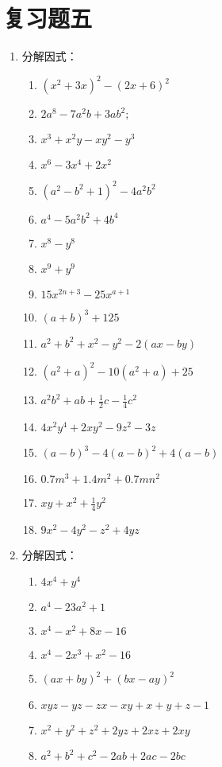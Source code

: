 \section*{复习题五}

\begin{enumerate}
\item 分解因式：
\begin{multicols}{2}
    \begin{enumerate}
    \item $\left(x^{2}+3 x\right)^{2}-(2 x+6)^{2}$
    \item $2 a^{8}-7 a^{2} b+3 a b^{2} ;$
    \item  $x^{3}+x^{2} y-x y^{2}-y^{3}$
    \item  $x^{6}-3 x^{4}+2 x^{2}$
    \item  $\left(a^{2}-b^{2}+1\right)^{2}-4 a^{2} b^{2}$
    \item  $a^{4}-5 a^{2} b^{2}+4 b^{4}$
    \item  $x^{8}-y^{8}$
    \item  $x^{9}+y^{9}$
    \item  $15 x^{2 n+3}-25 x^{a+1}$ 
    \item  $(a+b)^{3}+125$
    \item  $a^{2}+b^{2}+x^{2}-y^{2}-2(a x-b y)$
    \item  $\left(a^{2}+a\right)^{2}-10\left(a^{2}+a\right)+25$
    \item  $a^{2} b^{2}+a b+\frac{1}{2} c-\frac{1}{4} c^{2}$ 
    \item  $4 x^{2} y^{4}+2 x y^{2}-9 z^{2}-3 z$
    \item  $(a-b)^{3}-4(a-b)^{2}+4(a-b)$
    \item  $0.7 m^{3}+1.4 m^{2}+0.7 m n^{2}$ 
    \item  $x y+x^{2}+\frac{1}{4} y^{2}$
    \item  $9 x^{2}-4 y^{2}-z^{2}+4 y z$
\end{enumerate}
\end{multicols}

\item 分解因式：
\begin{multicols}{2}
\begin{enumerate}
    \item $4 x^{4}+y^{4} $
    \item $a^{4}-23 a^{2}+1$
    \item $x^{4}-x^{2}+8 x-16$
    \item $x^{4}-2 x^{3}+x^{2}-16$
    \item $(a x+b y)^{2}+(b x-a y)^{2}$
    \item   $x y z-y z-z x-x y+x+y+z-1$
    \item  $x^{2}+y^{2}+z^{2}+2 y z+2 x z+2 x y$
    \item  $a^{2}+b^{2}+c^{2}-2 a b+2 a c-2 b c$
\end{enumerate}
\end{multicols}


\end{enumerate}
